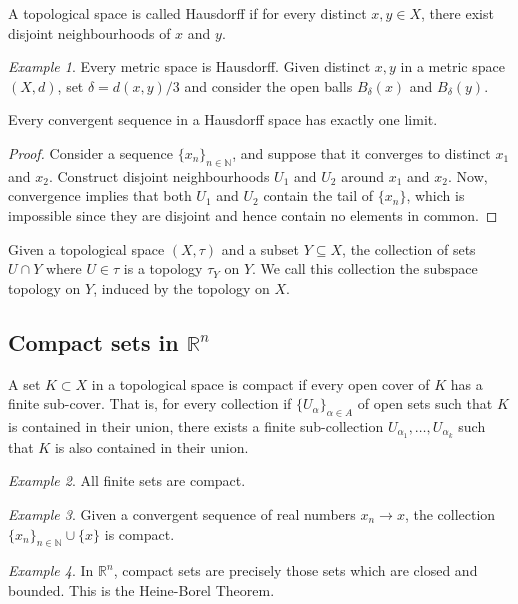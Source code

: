 \documentclass[11pt]{article}
\newcommand{\R}{\mathbb{R}}
\newcommand{\N}{\mathbb{N}}
\theoremstyle{definition}
\theoremstyle{remark}
\newtheorem*{example}{Example}
\numberwithin{equation}{section}
\begin{document}
    \begin{definition}
        A topological space is called Hausdorff if for every distinct $x, y \in X$,
        there exist disjoint neighbourhoods of $x$ and $y$.
    \end{definition}
    \begin{example}
        Every metric space is Hausdorff.
        Given distinct $x, y$ in a metric space $(X, d)$, set $\delta = d(x, y) / 3$
        and consider the open balls $B_{\delta}(x)$ and $B_\delta(y)$.
    \end{example}
    
    \begin{lemma}
        Every convergent sequence in a Hausdorff space has exactly one limit.
    \end{lemma}
    \begin{proof}
        Consider a sequence $\{x_n\}_{n \in \N}$, and suppose that it converges to
        distinct $x_1$ and $x_2$. Construct disjoint neighbourhoods $U_1$ and $U_2$
        around $x_1$ and $x_2$. Now, convergence implies that both $U_1$ and $U_2$
        contain the tail of $\{x_n\}$, which is impossible since they are disjoint
        and hence contain no elements in common.
    \end{proof}

    \begin{definition}
        Given a topological space $(X, \tau)$ and a subset $Y\subseteq X$, the
        collection of sets $U \cap Y$ where $U \in \tau$ is a topology $\tau_Y$ on
        $Y$. We call this collection the subspace topology on $Y$, induced by the
        topology on $X$.
    \end{definition}

    \subsection{Compact sets in $\R^n$}
    
    \begin{definition}
        A set $K \subset X$ in a topological space is compact if every open cover of
        $K$ has a finite sub-cover. That is, for every collection if
        $\{U_\alpha\}_{\alpha \in A}$ of open sets such that $K$ is contained in
        their union, there exists a finite sub-collection $U_{\alpha_1}, \dots,
        U_{\alpha_k}$ such that $K$ is also contained in their union.
    \end{definition}
    \begin{example}
        All finite sets are compact.
    \end{example}
    \begin{example}
        Given a convergent sequence of real numbers $x_n \to x$, the collection
        $\{x_n\}_{n \in \N} \cup \{x\}$ is compact.
    \end{example}
    \begin{example}
        In $\R^n$, compact sets are precisely those sets which are closed and
        bounded. This is the Heine-Borel Theorem.
    \end{example}
\end{document}
